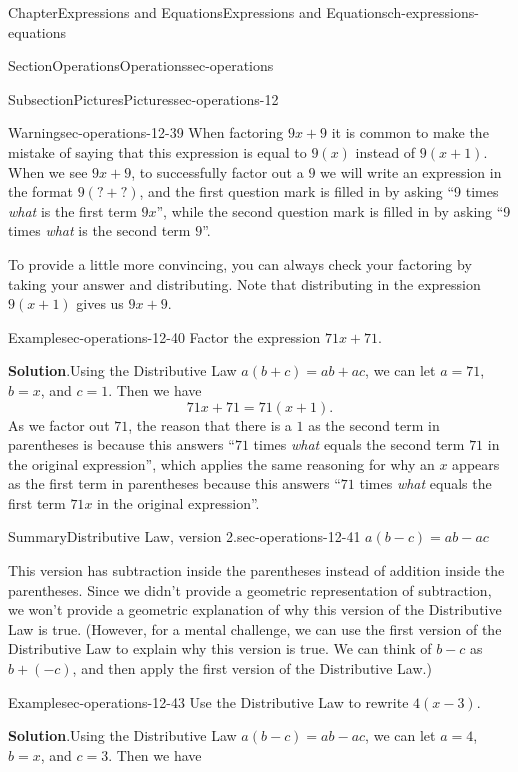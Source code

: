 \documentclass[twoside,11pt,]{book}
\newcommand{\blocktitlefont}{\relax}
\numberwithin{equation}{chapter}
\begin{document}
\begin{chapterptx}{Chapter}{Expressions and Equations}{}{Expressions and Equations}{}{}{ch-expressions-equations}
\begin{sectionptx}{Section}{Operations}{}{Operations}{}{}{sec-operations}
\begin{subsectionptx}{Subsection}{Pictures}{}{Pictures}{}{}{sec-operations-12}
\begin{warning}{Warning}{}{sec-operations-12-39}
When factoring \(9x + 9\) it is common to make the mistake of saying that this expression is equal to \(9(x)\) instead of \(9(x + 1)\). When we see \(9x+9\), to successfully factor out a \(9\) we will write an expression in the format \(9(? + ?)\), and the first question mark is filled in by asking ``9 times \emph{what} is the first term \(9x\)'', while the second question mark is filled in by asking ``9 times \emph{what} is the second term \(9\)''.%
\par
To provide a little more convincing, you can always check your factoring by taking your answer and distributing. Note that distributing in the expression \(9(x+1)\) gives us \(9x+9\).%
\end{warning}
\begin{example}{Example}{}{sec-operations-12-40}%
Factor the expression \(71x + 71\).%
\par\smallskip%
\noindent\textbf{\blocktitlefont Solution}.\hypertarget{sec-operations-12-40-2}{}\quad{}Using the Distributive Law \(a(b+c)=ab+ac\), we can let \(a=71\), \(b=x\), and \(c=1\). Then we have%
\begin{equation*}
71x + 71 = 71(x + 1).
\end{equation*}
As we factor out \(71\), the reason that there is a \(1\) as the second term in parentheses is because this answers ``\(71\) times \emph{what} equals the second term \(71\) in the original expression'', which applies the same reasoning for why an \(x\) appears as the first term in parentheses because this answers ``\(71\) times \emph{what} equals the first term \(71x\) in the original expression''.%
\end{example}
\begin{assemblage}{Summary}{Distributive Law, version 2.}{sec-operations-12-41}%
\(a(b-c)=ab-ac\)%
\end{assemblage}
This version has subtraction inside the parentheses instead of addition inside the parentheses. Since we didn't provide a geometric representation of subtraction, we won't provide a geometric explanation of why this version of the Distributive Law is true. (However, for a mental challenge, we can use the first version of the Distributive Law to explain why this version is true. We can think of \(b-c\) as \(b+(-c)\), and then apply the first version of the Distributive Law.)%
\begin{example}{Example}{}{sec-operations-12-43}%
Use the Distributive Law to rewrite \(4(x - 3)\).%
\par\smallskip%
\noindent\textbf{\blocktitlefont Solution}.\hypertarget{sec-operations-12-43-2}{}\quad{}Using the Distributive Law \(a(b-c)=ab-ac\), we can let \(a=4\), \(b=x\), and \(c=3\). Then we have%

\end{example}
\end{subsectionptx}
\end{sectionptx}
\end{chapterptx}
\end{document}
